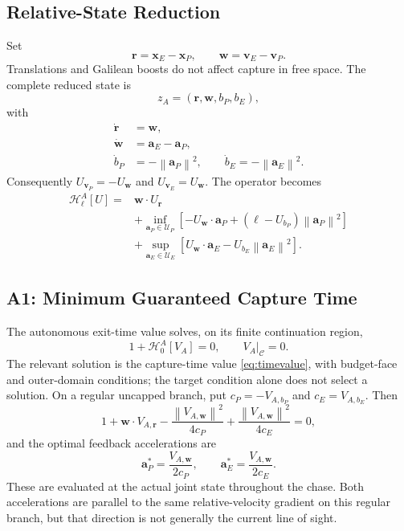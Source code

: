 \documentclass[journal,a4paper]{IEEEtran}
\newcommand{\C}{\mathcal C}
\newcommand{\U}{\mathcal U}
\newcommand{\HH}{\mathcal H}
\newcommand{\norm}[1]{\left\|#1\right\|}
\begin{document}
\subsection{Relative-State Reduction}
Set
\begin{equation}
 \mathbf r=\mathbf x_E-\mathbf x_P,\qquad
 \mathbf w=\mathbf v_E-\mathbf v_P.
\end{equation}
Translations and Galilean boosts do not affect capture in free space. The complete reduced state is
\begin{equation}
 z_A=(\mathbf r,\mathbf w,b_P,b_E),
\end{equation}
with
\begin{subequations}\label{eq:relative}
\begin{align}
 \dot{\mathbf r}&=\mathbf w,\\
 \dot{\mathbf w}&=\mathbf a_E-\mathbf a_P,\\
 \dot b_P&=-\norm{\mathbf a_P}^2,\qquad
 \dot b_E=-\norm{\mathbf a_E}^2.
\end{align}
\end{subequations}
Consequently $U_{\mathbf v_P}=-U_{\mathbf w}$ and $U_{\mathbf v_E}=U_{\mathbf w}$. The operator becomes
\begin{align}
 \HH^A_\ell[U]={}&\mathbf w\cdot U_{\mathbf r}\nonumber\\
 &+\inf_{\mathbf a_P\in\U_P}
 [-U_{\mathbf w}\cdot\mathbf a_P
               +(\ell-U_{b_P})\norm{\mathbf a_P}^2]\nonumber\\
 &+\sup_{\mathbf a_E\in\U_E}
 [U_{\mathbf w}\cdot\mathbf a_E-U_{b_E}\norm{\mathbf a_E}^2].
 \label{eq:HA}
\end{align}

\subsection{A1: Minimum Guaranteed Capture Time}
The autonomous exit-time value solves, on its finite continuation region,
\begin{equation}
 \boxed{1+\HH^A_0[V_A]=0,\qquad V_A|_{\C}=0.}
 \label{eq:A1}
\end{equation}
The relevant solution is the capture-time value \eqref{eq:timevalue}, with budget-face and outer-domain conditions; the target condition alone does not select a solution. On a regular uncapped branch, put $c_P=-V_{A,b_P}$ and $c_E=V_{A,b_E}$. Then
\begin{equation}
 1+\mathbf w\cdot V_{A,\mathbf r}
 -\frac{\norm{V_{A,\mathbf w}}^2}{4c_P}
 +\frac{\norm{V_{A,\mathbf w}}^2}{4c_E}=0,
 \label{eq:A1expanded}
\end{equation}
and the optimal feedback accelerations are
\begin{equation}
 \boxed{\mathbf a_P^*=\frac{V_{A,\mathbf w}}{2c_P},\qquad
        \mathbf a_E^*=\frac{V_{A,\mathbf w}}{2c_E}.}
 \label{eq:A1feedback}
\end{equation}
These are evaluated at the actual joint state throughout the chase. Both accelerations are parallel to the same relative-velocity gradient on this regular branch, but that direction is not generally the current line of sight.
\end{document}
